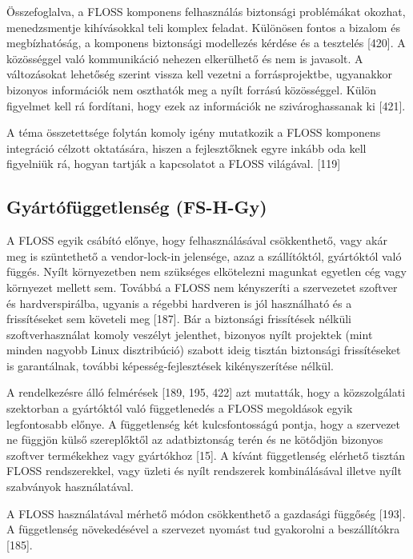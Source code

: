 \documentclass[12pt,magyar,a4paper,oneside]{scrreprt}
\begin{document}
Összefoglalva, a FLOSS komponens felhasználás biztonsági problémákat
okozhat, menedzsmentje kihívásokkal teli komplex feladat. Különösen
fontos a bizalom és megbízhatóság, a komponens biztonsági modellezés
kérdése és a tesztelés {[}420{]}. A közösséggel való kommunikáció
nehezen elkerülhető és nem is javasolt. A változásokat lehetőség szerint
vissza kell vezetni a forrásprojektbe, ugyanakkor bizonyos információk
nem oszthatók meg a nyílt forrású közösséggel. Külön figyelmet kell rá
fordítani, hogy ezek az információk ne szivároghassanak ki {[}421{]}.

A téma összetettsége folytán komoly igény mutatkozik a FLOSS komponens
integráció célzott oktatására, hiszen a fejlesztőknek egyre inkább oda
kell figyelniük rá, hogyan tartják a kapcsolatot a FLOSS világával.
{[}119{]}

\hypertarget{sec:FS-H-Gy}{%
\subsection{Gyártófüggetlenség (FS-H-Gy)}\label{sec:FS-H-Gy}}

A FLOSS egyik csábító előnye, hogy felhasználásával csökkenthető, vagy
akár meg is szüntethető a vendor-lock-in jelensége, azaz a szállítóktól,
gyártóktól való függés. Nyílt környezetben nem szükséges elkötelezni
magunkat egyetlen cég vagy környezet mellett sem. Továbbá a FLOSS nem
kényszeríti a szervezetet szoftver és hardverspirálba, ugyanis a régebbi
hardveren is jól használható és a frissítéseket sem követeli meg
{[}187{]}. Bár a biztonsági frissítések nélküli szoftverhasználat komoly
veszélyt jelenthet, bizonyos nyílt projektek (mint minden nagyobb Linux
disztribúció) szabott ideig tisztán biztonsági frissítéseket is
garantálnak, további képesség-fejlesztések kikényszerítése nélkül.

A rendelkezésre álló felmérések {[}189, 195, 422{]} azt mutatták, hogy a
közszolgálati szektorban a gyártóktól való függetlenedés a FLOSS
megoldások egyik legfontosabb előnye. A függetlenség két kulcsfontosságú
pontja, hogy a szervezet ne függjön külső szereplőktől az adatbiztonság
terén és ne kötődjön bizonyos szoftver termékekhez vagy gyártókhoz
{[}15{]}. A kívánt függetlenség elérhető tisztán FLOSS rendszerekkel,
vagy üzleti és nyílt rendszerek kombinálásával illetve nyílt szabványok
használatával.

A FLOSS használatával mérhető módon csökkenthető a gazdasági függőség
{[}193{]}. A függetlenség növekedésével a szervezet nyomást tud
gyakorolni a beszállítókra {[}185{]}.
\end{document}
